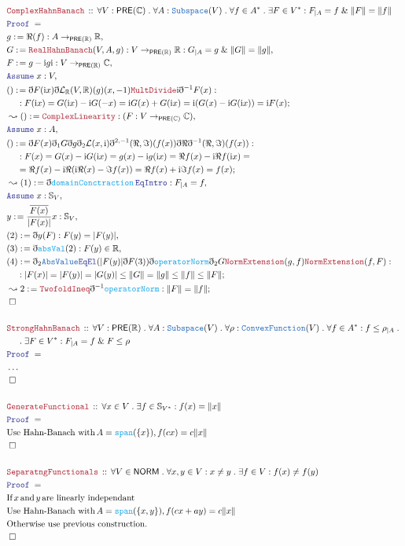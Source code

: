 \documentclass[12pt]{scrartcl}
\newcommand{\TYPE}[1]{\textcolor{NavyBlue}{\mathtt{#1}}}
\newcommand{\FUNC}[1]{\textcolor{Cerulean}{\mathtt{#1}}}
\newcommand{\LOGIC}[1]{\textcolor{Blue}{\mathtt{#1}}}
\newcommand{\THM}[1]{\textcolor{Maroon}{\mathtt{#1}}}
\renewcommand{\.}{\; . \;}
\newcommand{\de}{: \kern 0.1pc =}
\newcommand{\Theorem}[2]{& \THM{#1} \, :: \, #2 \\ & \Proof = \\ }
\newcommand{\NewLine}{\\ & \kern 1pc}
\newcommand{\Page}[1]{\begin{align*} #1 \end{align*} \newpage   }
\newcommand{ \bd }{ \ByDef }
\newcommand{\NoProof}{ & \ldots \\ \EndProof}
\renewcommand{\And}{\; \& \;}
\newcommand{\Reals}{\mathbb{R} }
\newcommand{\Say}[3]{& #1 \de #2 : #3, \\}
\newcommand{\Conclude}[3]{& #1 \de #2 : #3; \\}
\newcommand{\Derive}[3]{& \leadsto #1 \de #2 : #3, \\}
\newcommand{\DeriveConclude}[3]{& \leadsto #1 \de #2 : #3 ; \\}
\newcommand{\A}{\LOGIC{Assume} \;}
\newcommand{\Assume}[2]{& \A #1 : #2, \\}
\newcommand{\QED}{\; \square}
\newcommand{\EndProof}{& \QED \\}
\newcommand{\ByDef}{\eth}
\newcommand{\Proof}{\LOGIC{Proof} \; }
\newcommand{\Sphere}{\mathbb{S}}
\newcommand{\PRE}{\mathsf{PRE}} %
\newcommand{\NORM}{\mathsf{NORM}} %
\begin{document}
 \Page{
          \Theorem{ComplexHahnBanach}
            {\forall V : \PRE(\mathbb{C}) \. \forall A : \TYPE{Subspace}(V) \.
     \forall f \in A^*  \. \exists F \in V^* :  F_{|A} = f \And \| F \| = \| f \|    
     }
     \Say{g}{\Re(f) }{ A \to_{\PRE(\Reals)} \Reals }
     \Say{G}{\THM{RealHahnBanach}(V,A,g)}{ V \to_{\PRE(\Reals)} \Reals : G_{|A} = g \And \| G \| = \| g \| }
    \Say{F}{ g - \mathrm{i}g\mathrm{i}}{V \to_{\PRE(\Reals)} \mathbb{C}}
    \Assume{x}{V}
    \Conclude{()}{ \bd F( \mathrm{i}x) \bd \mathcal{L}_\Reals(V,\Reals)(g)(x,-1)\THM{MultDivide}{ \mathrm{i}}\bd^{-1}F(x)  }{ 
     \NewLine  : 
     F( \mathrm{i}x) = G( \mathrm{i}x) - \mathrm{i} G(-x) = \mathrm{i}G(x) + G( \mathrm{i}x) = 
    \mathrm{i}(G(x) -  \mathrm{i}G(  \mathrm{i}x)) = \mathrm{i}F(x) }
 \Derive{()}{\THM{ComplexLinearity}}{(F : V \to_{\PRE(\mathbb{C}) } \mathbb{C}) }
  \Assume{x}{A}
  \Conclude{()}{ \bd F(x) \bd_1 G \bd g 
  \bd_2 \mathcal{L}(x,\mathrm{i})  
  \bd^{2,-1}(\Re, \Im )(f(x)) \bd \Re \bd^{-1}(\Re, \Im )(f(x))  }
  {
   \NewLine : 
  F(x) = G(x) - \mathrm{i}G(\mathrm{i}x) = g(x) - \mathrm{i}g(\mathrm{i}x) 
    =  \Re f(x) - \mathrm{i} \Re f(\mathrm{i}x)     =
    \NewLine   
    = \Re f(x) - \mathrm{i} \Re  ( \mathrm{i} \Re(x)- \Im f(x) )
    =  \Re f(x) + \mathrm{i} \Im f(x) = f(x)   }
  \Derive{(1)}{\bd\FUNC{domainConctraction} \, \LOGIC{EqIntro}}{F_{|A} = f}
  \Assume{x}{\Sphere_V}
  \Say{  y }{ \frac{\overline{F(x)}}{|F(x)|}x}{ \Sphere_V }
  \Say{ (2) }{ \bd y (F) }{ F(y) = | F(y) |}
  \Say{ (3)}{ \bd \FUNC{absVal}(2)  }{F(y) \in \Reals}
  \Conclude{ (4) }{ \bd_2 \TYPE{AbsValue} \LOGIC{EqEl}( | F(y)| \bd F(3)) \bd \FUNC{operatorNorm}
   \bd_2  G  \THM{NormExtension}(g,f) \THM{NormExtension}(f,F)  
    : \NewLine 
   }
  { |F(x)| = |F(y)| = |G(y)| \le \| G \| = \| g \| \le \| f \| \le \| F \| }
   \DeriveConclude{2}{\THM{TwofoldIneq} \bd^{-1} \FUNC{operatorNorm}}{ \| F \| = \| f \|  }
   \EndProof
  \\
  \Theorem{StrongHahnBanach}{
   \forall V : \PRE(\Reals) \. \forall A : \TYPE{Subspace}(V) \.
    \forall \rho : \TYPE{ConvexFunction}(V) \.
     \forall f \in A^* : f \le \rho_{|A}  \. 
     \NewLine \.
     \exists F \in V^* :  F_{|A} = f \And  F \le \rho
  }
  \NoProof
  \\
  \Theorem{GenerateFunctional}{\forall x \in V \. \exists f \in \Sphere_{V^*} : f(x) =  \| x \|}
  & \textrm{Use Hahn-Banach with} \, A = \FUNC{span}(\{x\}) , f(cx) = c\|x\| \\
  \EndProof
  \\
  \Theorem{SeparatngFunctionals}{
      \forall V \in \NORM \.
       \forall x,y \in V : x \neq y \. \exists f \in V : f(x) \neq f(y)    
    }
    & \textrm{If} \, x \, \textrm{and} \, y \, \textrm{are linearly independant} \\
    &  \textrm{Use Hahn-Banach with} \, A = \FUNC{span}(\{x,y\}) , f(cx + ay) = c\|x\|  \\
    &  \textrm{Otherwise use previous construction.} \\
    \EndProof
    \\
  }
\end{document}
